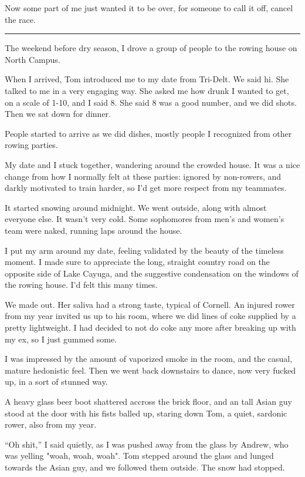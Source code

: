 Now some part of me just wanted it to be over, for someone to call it off,
cancel the race.

\plainfancybreak{12pt}{2}{* * *}

The weekend before dry season, I drove a group of people to the rowing house on
North Campus.

When I arrived, Tom introduced me to my date from Tri-Delt.  We said hi.  She
talked to me in a very engaging way.   She asked me how drunk I wanted to get,
on a scale of 1-10, and I said 8.  She said 8 was a good number, and we did
shots.  Then we sat down for dinner.

People started to arrive as we did dishes, mostly people I recognized from other
rowing parties.  

My date and I stuck together, wandering around the crowded house. It was a nice
change from how I normally felt at these parties: ignored by non-rowers, and
darkly motivated to train harder, so I'd get more respect from my teammates.

It started snowing around midnight.  We went outside, along with almost everyone
else.  It wasn't very cold.  Some sophomores from men's and women's team were
naked, running laps around the house.

I put my arm around my date, feeling validated by the beauty of the timeless
moment.   I made sure to appreciate the long, straight country road on the
opposite side of Lake Cayuga, and the suggestive condensation on the windows of
the rowing house.  I'd felt this many times.

We made out. Her saliva had a strong taste, typical of Cornell.  An injured
rower from my year invited us up to his room, where we did lines of coke
supplied by a pretty lightweight.  I had decided to not do coke any more after
breaking up with my ex, so I just gummed some.  

I was impressed by the amount of vaporized smoke in the room, and the casual,
mature hedonistic feel.  Then we went back downstairs to dance, now very fucked
up, in a sort of stunned way.  

A heavy glass beer boot shattered accross the brick floor, and an tall Asian guy
stood at the door with his fists balled up, staring down Tom, a quiet, sardonic
rower, also from my year.  

``Oh shit,'' I said quietly, as I was pushed away from the glass by Andrew, who
was yelling "woah, woah, woah".  Tom stepped around the glass and lunged towards
the Asian guy, and we followed them outside.  The snow had stopped.

